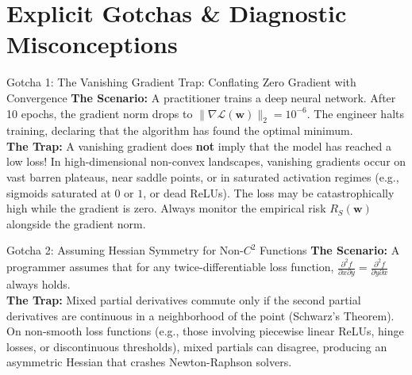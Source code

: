\section{Explicit Gotchas \& Diagnostic Misconceptions}

\begin{trapbox}{Gotcha 1: The Vanishing Gradient Trap: Conflating Zero Gradient with Convergence}
\textbf{The Scenario:} A practitioner trains a deep neural network. After 10 epochs, the gradient norm drops to $\|\nabla \mathcal{L}(\mathbf{w})\|_2 = 10^{-6}$. The engineer halts training, declaring that the algorithm has found the optimal minimum. \\
\textbf{The Trap:} A vanishing gradient does \textbf{not} imply that the model has reached a low loss! In high-dimensional non-convex landscapes, vanishing gradients occur on vast barren plateaus, near saddle points, or in saturated activation regimes (e.g., sigmoids saturated at $0$ or $1$, or dead ReLUs). The loss may be catastrophically high while the gradient is zero. Always monitor the empirical risk $R_S(\mathbf{w})$ alongside the gradient norm.
\end{trapbox}

\begin{trapbox}{Gotcha 2: Assuming Hessian Symmetry for Non-$C^2$ Functions}
\textbf{The Scenario:} A programmer assumes that for any twice-differentiable loss function, $\frac{\partial^2 f}{\partial x \partial y} = \frac{\partial^2 f}{\partial y \partial x}$ always holds. \\
\textbf{The Trap:} Mixed partial derivatives commute only if the second partial derivatives are continuous in a neighborhood of the point (Schwarz's Theorem). On non-smooth loss functions (e.g., those involving piecewise linear ReLUs, hinge losses, or discontinuous thresholds), mixed partials can disagree, producing an asymmetric Hessian that crashes Newton-Raphson solvers.
\end{trapbox}

